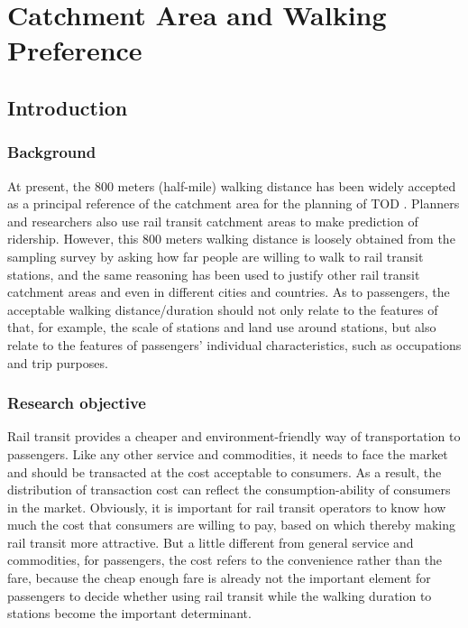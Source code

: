 \chapter{Catchment Area and Walking Preference}

\section{Introduction}
\subsection{Background}
At present, the 800 meters (half-mile) walking distance has been widely accepted as a principal reference of the catchment area for the planning of TOD \cite{kuby2004factors,gutierrez2011transit,cardozo2012application,zhao2013influences}. Planners and researchers also use rail transit catchment areas to make prediction of ridership. However, this 800 meters walking distance is loosely obtained from the sampling survey by asking how far people are willing to walk to rail transit stations, and the same reasoning has been used to justify other rail transit catchment areas and even in different cities and countries. As to passengers, the acceptable walking distance/duration should not only relate to the features of that, for example, the scale of stations and land use around stations, but also relate to the features of passengers' individual characteristics, such as occupations and trip purposes.

%
\subsection{Research objective}
Rail transit provides a cheaper and environment-friendly way of transportation to passengers. Like any other service and commodities, it needs to face the market and should be transacted at the cost acceptable to consumers. As a result, the distribution of transaction cost can reflect the consumption-ability of consumers in the market. Obviously, it is important for rail transit operators to know how much the cost that consumers are willing to pay, based on which thereby making rail transit more attractive. But a little different from general service and commodities, for passengers, the cost refers to the convenience rather than the fare, because the cheap enough fare is already not the important element for passengers to decide whether using rail transit while the walking duration to stations become the important determinant.

